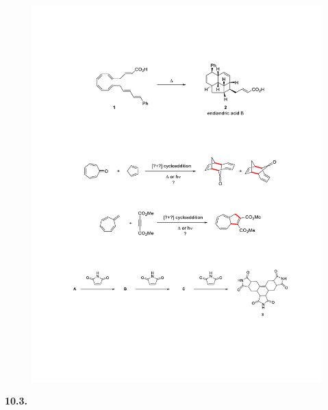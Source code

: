\begin{figure}[h]
	\centering
	\includegraphics[width=13cm]{./pic/t10-3.pdf}
\end{figure}

\noindent\textbf{10.3.}

